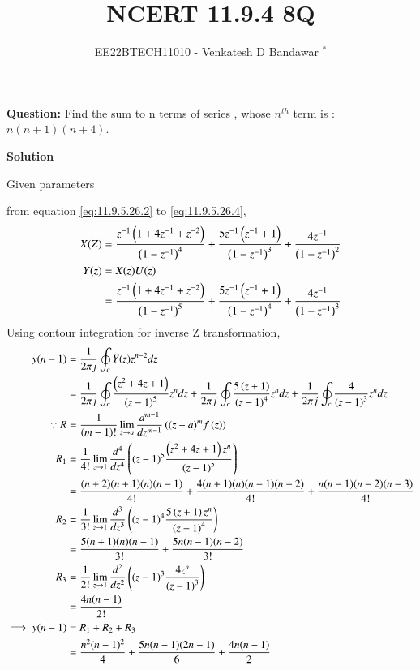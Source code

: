 \documentclass[journal,12pt,onecolumn]{IEEEtran}
\theoremstyle{remark}
\begin{document}

\vspace{3cm}

\title{NCERT 11.9.4 8Q}
\author{EE22BTECH11010 - Venkatesh D Bandawar $^{*}$%
}
\maketitle
\bigskip

\renewcommand{\thefigure}{\theenumi}
\renewcommand{\thetable}{\theenumi}

\textbf{Question:} Find the sum to n terms of series , whose $n^{th}$ term is : $n(n+1)(n+4)$.

\textbf{Solution}
\begin{table}[!h] 
\centering

\caption{Given parameters}
\label{given parameters list}
\end{table}

from equation \eqref{eq:11.9.5.26.2} to \eqref{eq:11.9.5.26.4},\\
    \begin{align}
        X(Z) &= \frac{z^{-1}\left(1+4z^{-1}+z^{-2}\right)}{\left(1-z^{-1}\right)^4} + \frac{5z^{-1}\left(z^{-1}+1\right)}{\left(1-z^{-1}\right)^3} + \frac{4z^{-1}}{\left(1-z^{-1}\right)^2} \\
        Y(z) &= X(z)U(z)\\
        &= \frac{z^{-1}\left(1+4z^{-1}+z^{-2}\right)}{\left(1-z^{-1}\right)^5} + \frac{5z^{-1}\left(z^{-1}+1\right)}{\left(1-z^{-1}\right)^4} + \frac{4z^{-1}}{\left(1-z^{-1}\right)^3} 
    \end{align}
Using contour integration for inverse Z transformation,
    \begin{align}
        y(n-1) &= \frac{1}{2\pi j}\oint_c Y(z) z^{n-2} dz \\
        &= \frac{1}{2\pi j}\oint_c \frac{\left(z^2+4z+1\right)}{\left(z-1\right)^5} z^{n} dz  + \frac{1}{2\pi j}\oint_c \frac{5\left(z+1\right)}{\left(z-1\right)^4} z^{n} dz  + \frac{1}{2\pi j}\oint_c \frac{4}{\left(z-1\right)^3} z^{n} dz \\
        \because R&=\frac{1}{\left(m-1\right)!}\lim\limits_{z\to a}\frac{d^{m-1}}{dz^{m-1}}\left({(z-a)}^{m}f\left(z\right)\right)\\
        R_1 &=\frac{1}{4!}\lim\limits_{z\to 1}\frac{d^4}{dz^4}\left((z-1)^5 \frac{\left(z^2+4z+1\right)z^n}{\left(z-1\right)^5}\right)\\
        &= \frac{(n+2)(n+1)(n)(n-1)}{4!} + \frac{4(n+1)(n)(n-1)(n-2)}{4!} + \frac{n(n-1)(n-2)(n-3)}{4!}\\
        R_2 &=\frac{1}{3!}\lim\limits_{z\to 1}\frac{d^3}{dz^3} \left((z-1)^4 \frac{5\left(z+1\right)z^n}{\left(z-1\right)^4}\right)\\
        &= \frac{5(n+1)(n)(n-1)}{3!} + \frac{5n(n-1)(n-2)}{3!}\\
        R_3 &=\frac{1}{2!}\lim\limits_{z\to 1}\frac{d^2}{dz^2} \left((z-1)^3 \frac{4z^n}{\left(z-1\right)^3}\right)\\
        &= \frac{4n(n-1)}{2!}\\
        \implies y(n-1) &= R_1 + R_2 + R_3 \\
        &= \frac{n^2(n-1)^2}{4} + \frac{5n(n-1)(2n-1)}{6} + \frac{4n(n-1)}{2}
    \end{align}
\end{document}
